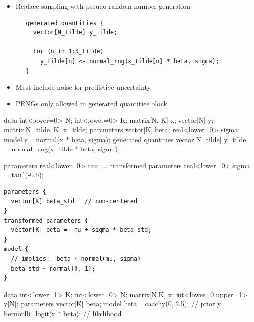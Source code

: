 \documentclass[10pt]{report}
\begin{document}
%
\begin{itemize}
\item Replace sampling with pseudo-random number generation
{\footnotesize
\begin{Verbatim}
   generated quantities {
     vector[N_tilde] y_tilde;

     for (n in 1:N_tilde)
       y_tilde[n] <- normal_rng(x_tilde[n] * beta, sigma);
   }
\end{Verbatim}
}
\item Must include noise for predictive uncertainty
\item PRNGs only allowed in generated quantities block
\end{itemize}


%
\begin{stancode}
data {
  int<lower=0> N;               int<lower=0> K;
  matrix[N, K] x;               vector[N] y;
  matrix[N_tilde, K] x_tilde;
}
parameters {
  vector[K] beta;               real<lower=0> sigma;
}
model {
  y ~ normal(x * beta, sigma);
}
generated quantities {
  vector[N_tilde] y_tilde
    = normal_rng(x_tilde * beta, sigma);
}
\end{stancode}


%
\begin{stancode}
    parameters {
      real<lower=0> tau;
      ...
    }
    transformed parameters {
      real<lower=0> sigma = tau^(-0.5);
    }
\end{stancode}


{\small
\begin{Verbatim}
parameters {
  vector[K] beta_std;  // non-centered
}
transformed parameters {
  vector[K] beta =  mu + sigma * beta_std;
}
model {
  // implies:  beta ~ normal(mu, sigma)
  beta_std ~ normal(0, 1);
}
\end{Verbatim}
}


%
\begin{stancode}
     data {
       int<lower=1> K;
       int<lower=0> N;
       matrix[N,K] x;
       int<lower=0,upper=1> y[N];
     }
     parameters {
       vector[K] beta;
     }
     model {
        beta ~ cauchy(0, 2.5);          // prior
        y ~ bernoulli_logit(x * beta);  // likelihood
     }
\end{stancode}
\end{document}
